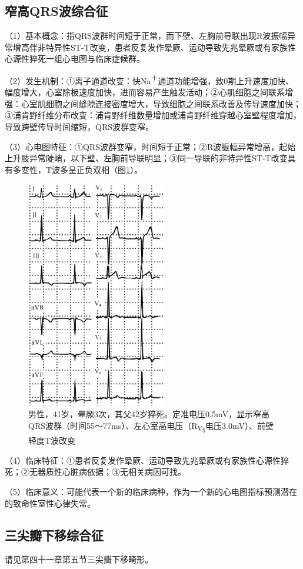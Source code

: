 \subsection{窄高QRS波综合征}

（1）基本概念：指QRS波群时间短于正常，而下壁、左胸前导联出现R波振幅异常增高伴非特异性ST-T改变，患者反复发作晕厥、运动导致先兆晕厥或有家族性心源性猝死一组心电图与临床症候群。

（2）发生机制：①离子通道改变：快Na\textsuperscript{＋}通道功能增强，致0期上升速度加快、幅度增大，心室除极速度加快，进而容易产生触发活动；②心肌细胞之间联系增强：心室肌细胞之间缝隙连接密度增大，导致细胞之间联系改善及传导速度加快；③浦肯野纤维分布改变：浦肯野纤维数量增加或浦肯野纤维穿越心室壁程度增加，导致跨壁传导时间缩短，QRS波群变窄。

（3）心电图特征：①QRS波群变窄，时间短于正常；②R波振幅异常增高，起始上升肢异常陡峭，以下壁、左胸前导联明显；③同一导联的非特异性ST-T改变具有多变性，T波多呈正负双相（图\ref{fig40-20}）。

\begin{figure}[!htbp]
 \centering
 \includegraphics[width=2.38542in,height=3.92708in]{./images/Image00682.jpg}
 \captionsetup{justification=centering}
 \caption{男性，41岁，晕厥3次，其父42岁猝死。定准电压0.5mV，显示窄高QRS波群（时间55～77ms）、左心室高电压（R\textsubscript{V\textsubscript{5}}电压3.0mV）、前壁轻度T波改变}
 \label{fig40-20}
  \end{figure} 


（4）临床特征：①患者反复发作晕厥、运动导致先兆晕厥或有家族性心源性猝死；②无器质性心脏病依据；③无相关病因可找。

（5）临床意义：可能代表一个新的临床病种，作为一个新的心电图指标预测潜在的致命性室性心律失常。

\protect\hypertarget{text00047.htmlux5cux23subid579}{}{}

\subsection{三尖瓣下移综合征}

请见第四十一章第五节三尖瓣下移畸形。

\protect\hypertarget{text00048.html}{}{}

\protect\hypertarget{text00048.htmlux5cux23chapter48}{}{}

